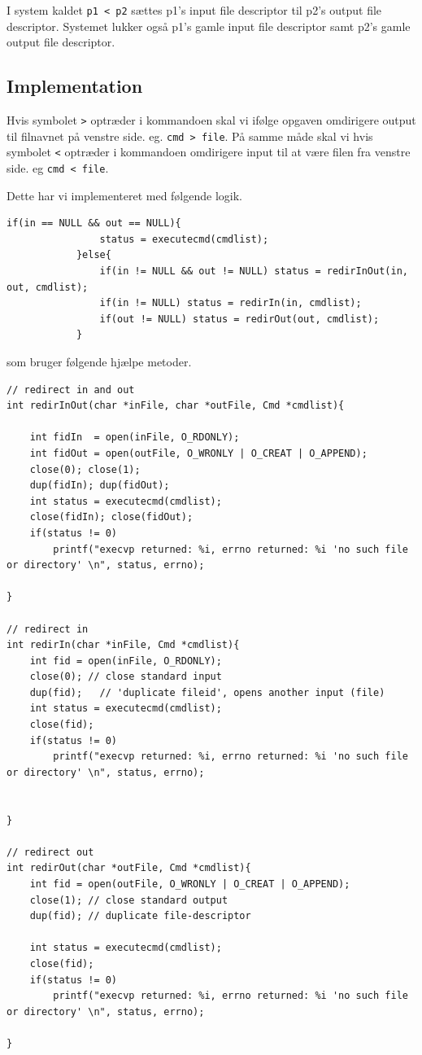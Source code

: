 \documentclass[danish]{report}
\begin{document}
I system kaldet  {\tt p1 < p2} sættes p1's input file descriptor til p2's output file descriptor. Systemet lukker også p1's gamle input file descriptor samt p2's gamle output file descriptor. 

   
\subsection{Implementation}
Hvis symbolet {\tt >} optræder i kommandoen skal vi ifølge opgaven omdirigere output til filnavnet på venstre side. eg. {\tt cmd > file}. På samme måde skal vi hvis symbolet {\tt <} optræder i kommandoen omdirigere input til at være filen fra venstre side. eg {\tt cmd < file}. 

Dette har vi implementeret med følgende logik.

\begin{lstlisting}
if(in == NULL && out == NULL){
                status = executecmd(cmdlist);
            }else{
                if(in != NULL && out != NULL) status = redirInOut(in, out, cmdlist);
                if(in != NULL) status = redirIn(in, cmdlist);
                if(out != NULL) status = redirOut(out, cmdlist);
            }
\end{lstlisting}

som bruger følgende hjælpe metoder.

\begin{lstlisting}
// redirect in and out
int redirInOut(char *inFile, char *outFile, Cmd *cmdlist){
    
    int fidIn  = open(inFile, O_RDONLY);
    int fidOut = open(outFile, O_WRONLY | O_CREAT | O_APPEND);              
    close(0); close(1);
    dup(fidIn); dup(fidOut);
    int status = executecmd(cmdlist);
    close(fidIn); close(fidOut);
    if(status != 0) 
        printf("execvp returned: %i, errno returned: %i 'no such file or directory' \n", status, errno);

}

// redirect in
int redirIn(char *inFile, Cmd *cmdlist){
    int fid = open(inFile, O_RDONLY);  
    close(0); // close standard input
    dup(fid);   // 'duplicate fileid', opens another input (file)    
    int status = executecmd(cmdlist);
    close(fid);             
    if(status != 0) 
        printf("execvp returned: %i, errno returned: %i 'no such file or directory' \n", status, errno);


}

// redirect out
int redirOut(char *outFile, Cmd *cmdlist){
    int fid = open(outFile, O_WRONLY | O_CREAT | O_APPEND);         
    close(1); // close standard output
    dup(fid); // duplicate file-descriptor

    int status = executecmd(cmdlist);
    close(fid);             
    if(status != 0) 
        printf("execvp returned: %i, errno returned: %i 'no such file or directory' \n", status, errno);

}
\end{lstlisting}
\end{document}
